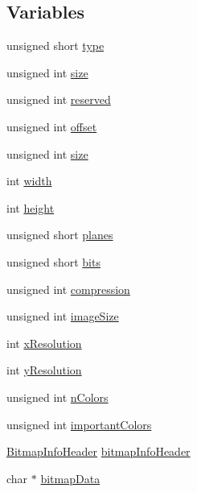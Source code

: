 \subsection*{Variables}
\begin{DoxyCompactItemize}
\item 
unsigned short \mbox{\hyperlink{group__bitmap_gaa929142c5ddf34cf0915c97a617a1a63}{type}}
\item 
unsigned int \mbox{\hyperlink{group__bitmap_gaac913b3a1f6ef005d66bf7a84428773e}{size}}
\item 
unsigned int \mbox{\hyperlink{group__bitmap_ga05d5cbcb44f437341bd9fa37d589aced}{reserved}}
\item 
unsigned int \mbox{\hyperlink{group__bitmap_ga29b5297d3393519050e3126c4cb07c1c}{offset}}
\item 
unsigned int \mbox{\hyperlink{group__bitmap_gaac913b3a1f6ef005d66bf7a84428773e}{size}}
\item 
int \mbox{\hyperlink{group__bitmap_ga2474a5474cbff19523a51eb1de01cda4}{width}}
\item 
int \mbox{\hyperlink{group__bitmap_gad12fc34ce789bce6c8a05d8a17138534}{height}}
\item 
unsigned short \mbox{\hyperlink{group__bitmap_ga8c89d091e05544a82dc2398eed99634f}{planes}}
\item 
unsigned short \mbox{\hyperlink{group__bitmap_ga47d1d4d776f8fd3bb0f7dbc3c5aeb534}{bits}}
\item 
unsigned int \mbox{\hyperlink{group__bitmap_gad180079f62b44e49ec672c9ef6e078b3}{compression}}
\item 
unsigned int \mbox{\hyperlink{group__bitmap_gadcd57a0168319e747bc8099218d3822c}{image\+Size}}
\item 
int \mbox{\hyperlink{group__bitmap_gac6eaeb4c0876cf6cd899f41fe3c25ff5}{x\+Resolution}}
\item 
int \mbox{\hyperlink{group__bitmap_gaa2f350dd0bda750656d5db5f5e37b2b3}{y\+Resolution}}
\item 
unsigned int \mbox{\hyperlink{group__bitmap_gaed4506bad904845183194f199f1bdb98}{n\+Colors}}
\item 
unsigned int \mbox{\hyperlink{group__bitmap_ga8f7abfbc446b12f385d2b42c3b4fd9b0}{important\+Colors}}
\item 
\mbox{\hyperlink{struct_bitmap_info_header}{Bitmap\+Info\+Header}} \mbox{\hyperlink{group__bitmap_ga7157ca7f3ce4be47481c472fafd89313}{bitmap\+Info\+Header}}
\item 
char $\ast$ \mbox{\hyperlink{group__bitmap_ga212b0ad51a5ac5d020dcf840678ef146}{bitmap\+Data}}
\end{DoxyCompactItemize}


